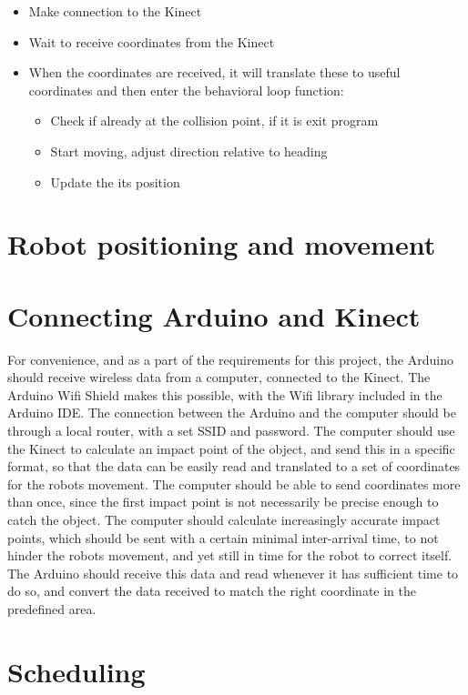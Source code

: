 \begin{itemize}
	\item Make connection to the Kinect
	\item Wait to receive coordinates from the Kinect
	\item When the coordinates are received, it will translate these to useful coordinates and then enter the behavioral loop function:
	\begin{itemize}
		\item Check if already at the collision point, if it is exit program
		\item Start moving, adjust direction relative to heading
		\item Update the its position
	\end{itemize}
\end{itemize}
 

\section{Robot positioning and movement}
\label{sec:Robot positioning and movement}

\section{Connecting Arduino and Kinect}
\label{sec:Connecting Arduino and Kinect}
For convenience, and as a part of the requirements for this project, the Arduino should receive wireless data from a computer, connected to the Kinect. The Arduino Wifi Shield makes this possible, with the Wifi library included in the Arduino IDE.
The connection between the Arduino and the computer should be through a local router, with a set SSID and password. The computer should use the Kinect to calculate an impact point of the object, and send this in a specific format, so that the data can be easily read and translated to a set of coordinates for the robots movement. The computer should be able to send coordinates more than once, since the first impact point is not necessarily be precise enough to catch the object. The computer should calculate increasingly accurate impact points, which should be sent with a certain minimal inter-arrival time, to not hinder the robots movement, and yet still in time for the robot to correct itself.
The Arduino should receive this data and read whenever it has sufficient time to do so, and convert the data received to match the right coordinate in the predefined area. 

\section{Scheduling}
\label{sec:Scheduling}
